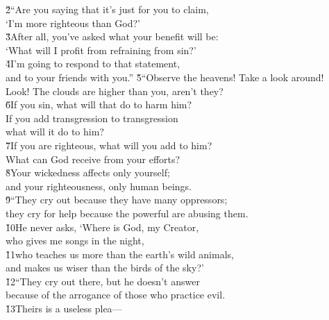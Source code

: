 \begin{poetry}
\poeml \v{2}``Are you saying that it's just for you to claim, \\
\poemll    `I'm more righteous than God?' \\
\poeml \v{3}After all, you've asked what your benefit will be: \\
\poemll    `What will I profit from refraining from sin?' \\
\poeml \v{4}I'm going to respond to that statement, \\
\poemll    and to your friends with you.''
\poeml \v{5}``Observe the heavens! Take a look around! \\
\poemll    Look! The clouds are higher than you, aren't they? \\
\poeml \v{6}If you sin, what will that do to harm him? \\
\poemll    If you add transgression to transgression \\
\poemlll       what will it do to him? \\
\poeml \v{7}If you are righteous, what will you add to him? \\
\poemll    What can God receive from your efforts? \\
\poeml \v{8}Your wickedness affects only yourself; \\
\poemll    and your righteousness, only human beings. \\
\poeml \v{9}``They cry out because they have many oppressors; \\
\poemll    they cry for help because the powerful are abusing them. \\
\poeml \v{10}He never asks, `Where is God, my Creator, \\
\poemll    who gives me songs in the night, \\
\poeml \v{11}who teaches us more than the earth's wild animals, \\
\poemll    and makes us wiser than the birds of the sky?' \\
\poeml \v{12}``They cry out there, but he doesn't answer \\
\poemll    because of the arrogance of those who practice evil. \\
\poeml \v{13}Theirs is a useless plea--- \\

\end{poetry}
